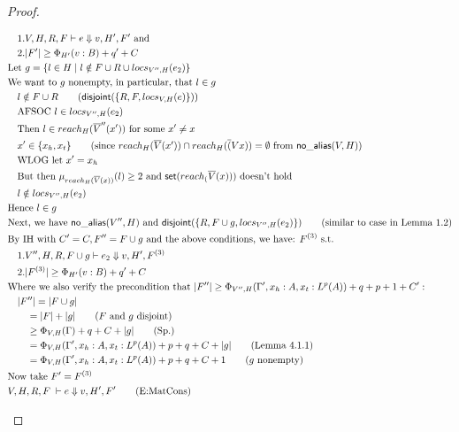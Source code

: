 \documentclass[11pt]{article}
\newcommand{\ms}[1]{\ensuremath{\mathsf{#1}}}
\newcommand{\na}[1]{\mathsf{no\_alias}(#1)}
\newcommand{\dist}[1]{\mathsf{disjoint}(#1)}
\theoremstyle{definition}
\begin{document}
\begin{proof}
\begin{description}
\begin{align*}
  &\quad 1. V,H,R,F \vdash e \Downarrow v, H',F' \text{ and }\\ 
  &\quad 2. |F'| \ge \Phi_{H'}(v:B) + q' + C\\
  &\text{Let } g = \{l \in H \mid l \notin F \cup R \cup locs_{V'',H}(e_2)\}\\
  &\text{We want to $g$ nonempty, in particular, that } l \in g\\
  &\quad l \notin F \cup R \tag{$\dist{\{R,F,locs_{V,H}(e)\}}$}\\
  &\quad \text{AFSOC } l \in locs_{V'',H}(e_2)\\
  &\quad \text{Then } l \in reach_H(\overline V'' (x')) \text{ for some } x' \ne x\\
  &\quad x' \in \{x_h,x_t\} \tag{since $reach_H(\overline V (x')) \cap reach_H(\overline (Vx)) = \emptyset$ from $\na{V,H}$}\\
  &\quad \text{WLOG let } x' = x_h\\
  &\quad \text{But then } \mu_{reach_H(\overline V(x))}(l) \ge 2 \text{ and } \ms{set}(reach_(\overline V(x))) \text{ doesn't hold}\\
  &\quad l \notin locs_{V'',H}(e_2)\\
  &\text{Hence } l \in g\\
	&\text{Next, we have } \na{V'',H} \text{ and } \dist{\{R,F \cup g,locs_{V'',H}(e_2)\}} \tag{similar to case in Lemma 1.2}\\
	&\text{By IH with } C' = C, F'' = F \cup g \text{ and the above conditions, we have: } F^{(3)} \text{ s.t.}\\
	&\quad 1. V'',H,R,F\cup g \vdash e_2 \Downarrow v,H',F^{(3)}\\
	&\quad 2. |F^{(3)}| \ge \Phi_{H'}(v:B) + q' + C\\
	&\text{Where we also verify the precondition that } |F''| \ge \Phi_{V'',H}(\Gamma',x_h:A,x_t:L^p(A)) + q + p + 1 + C':\\
	&\quad |F''| = |F \cup g|\\
	&\quad \quad = |F| + |g| \tag{$F$ and $g$ disjoint}\\
	&\quad \quad \ge \Phi_{V,H}(\Gamma) + q + C + |g| \tag{Sp.}\\
	&\quad \quad = \Phi_{V,H}(\Gamma',x_h:A,x_t:L^p(A)) + p + q + C + |g| \tag{Lemma 4.1.1}\\
	&\quad \quad = \Phi_{V,H}(\Gamma',x_h:A,x_t:L^p(A)) + p + q + C + 1 \tag{$g$ nonempty}\\
	&\text{Now take } F' = F^{(3)}\\
	&V,H,R,F \; \vdash e \Downarrow v,H',F' \tag{E:MatCons}\\

\end{align*}
\end{description}
\end{proof}
\end{document}
